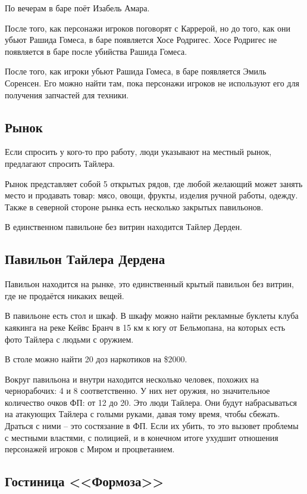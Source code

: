 \documentclass{article}
\begin{document}
По вечерам в баре поёт Изабель Амара.

После того, как персонажи игроков поговорят с Каррерой, но до того, как
они убьют Рашида Гомеса, в баре появляется Хосе Родригес. Хосе Родригес
не появляется в баре после убийства Рашида Гомеса.

После того, как игроки убьют Рашида Гомеса, в баре появляется Эмиль
Соренсен. Его можно найти там, пока персонажи игроков не используют его
для получения запчастей для техники.

\subsection{Рынок}\label{market}

Если спросить у кого-то про работу, люди указывают на местный рынок,
предлагают спросить Тайлера.

Рынок представляет собой 5 открытых рядов, где любой желающий может
занять место и продавать товар: мясо, овощи, фрукты, изделия ручной
работы, одежду. Также в северной стороне рынка есть несколько закрытых
павильонов.

В единственном павильоне без витрин находится Тайлер Дерден.

\subsection{Павильон Тайлера
Дердена}\label{tyler-den-pavilion}

Павильон находится на рынке, это единственный крытый павильон без
витрин, где не продаётся никаких вещей.

В павильоне есть стол и шкаф. В шкафу можно найти рекламные буклеты
клуба каякинга на реке Кейвс Бранч в 15 км к югу от Бельмопана, на
которых есть фото Тайлера с людьми с оружием.

В столе можно найти 20 доз наркотиков на \$2000.

Вокруг павильона и внутри находится несколько человек, похожих на
чернорабочих: 4 и 8 соответственно. У них нет оружия, но значительное
количество очков ФП: от 12 до 20. Это люди Тайлера. Они будут
набрасываться на атакующих Тайлера с голыми руками, давая тому время,
чтобы сбежать. Драться с ними -- это состязание в ФП. Если их убить, то
это вызовет проблемы с местными властями, с полицией, и в конечном итоге
ухудшит отношения персонажей игроков с Миром и процветанием.

\subsection{Гостиница
<<Формоза>>}\label{formosa-hotel}
\end{document}
